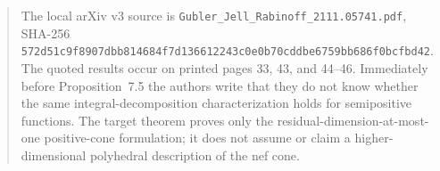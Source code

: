\begin{quote}
The local arXiv v3 source is
\texttt{Gubler\_Jell\_Rabinoff\_2111.05741.pdf}, SHA-256
\texttt{572d51c9f8907dbb814684f7d136612243c0e0b70cddbe6759bb686f0bcfbd42}.
The quoted results occur on printed pages 33, 43, and 44--46.  Immediately
before Proposition~7.5 the authors write that they do not know whether the
same integral-decomposition characterization holds for semipositive
functions.  The target theorem proves only the residual-dimension-at-most-one
positive-cone formulation; it does not assume or claim a higher-dimensional
polyhedral description of the nef cone.
\end{quote}
